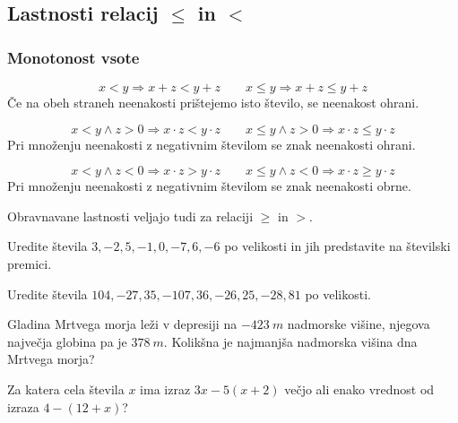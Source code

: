         \subsection{Lastnosti relacij $\leq$ in $<$}
        \subsubsection*{Monotonost vsote}
        $$x<y \Rightarrow x+z<y+z \quad \quad x\leq y \Rightarrow x+z\leq y+z$$
        Če na obeh straneh neenakosti prištejemo isto število, se neenakost ohrani.
    \newline

    
        $$x<y \land z>0 \Rightarrow x\cdot z<y\cdot z \quad \quad x\leq y \land z>0 \Rightarrow x\cdot z\leq y\cdot z$$
        Pri množenju neenakosti z negativnim številom se znak neenakosti ohrani.
        \newline

    
        $$x<y \land z<0 \Rightarrow x\cdot z>y\cdot z \quad \quad x\leq y \land z<0 \Rightarrow x\cdot z\geq y\cdot z$$
        Pri množenju neenakosti z negativnim številom se znak neenakosti obrne.
        \newline ~
        \newline

    
        Obravnavane lastnosti veljajo tudi za relaciji $\geq$ in $>$.
        \newline ~
        \newline ~
        \newline





        \begin{naloga}
            Uredite števila $3, -2, 5, -1, 0, -7, 6, -6$ po velikosti in jih predstavite na številski premici.
        \end{naloga}

        \begin{naloga}
            Uredite števila $104, -27, 35, -107, 36, -26, 25, -28, 81$ po velikosti.
        \end{naloga}

        \begin{naloga}
            Gladina Mrtvega morja leži v depresiji na $-423~m$ nadmorske višine, njegova največja globina pa je $378~m$.
            Kolikšna je najmanjša nadmorska višina dna Mrtvega morja?
        \end{naloga}

        \begin{naloga}
            Za katera cela števila $x$ ima izraz $3x-5(x+2)$ večjo ali enako vrednost od izraza $4-(12+x)$?
        \end{naloga}



